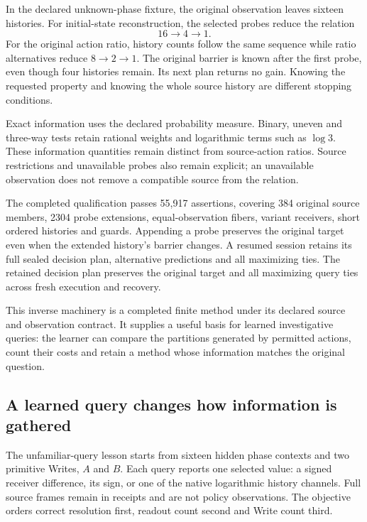 In the declared unknown-phase fixture, the original observation leaves sixteen histories. For initial-state reconstruction, the selected probes reduce the relation
\[
 16\longrightarrow4\longrightarrow1.
\]
For the original action ratio, history counts follow the same sequence while ratio alternatives reduce $8\to2\to1$. The original barrier is known after the first probe, even though four histories remain. Its next plan returns no gain. Knowing the requested property and knowing the whole source history are different stopping conditions.

Exact information uses the declared probability measure. Binary, uneven and three-way tests retain rational weights and logarithmic terms such as $\log3$. These information quantities remain distinct from source-action ratios. Source restrictions and unavailable probes also remain explicit; an unavailable observation does not remove a compatible source from the relation.

The completed qualification passes 55,917 assertions, covering 384 original source members, 2304 probe extensions, equal-observation fibers, variant receivers, short ordered histories and guards. Appending a probe preserves the original target even when the extended history's barrier changes. A resumed session retains its full sealed decision plan, alternative predictions and all maximizing ties. The retained decision plan preserves the original target and all maximizing query ties across fresh execution and recovery.

This inverse machinery is a completed finite method under its declared source and observation contract. It supplies a useful basis for learned investigative queries: the learner can compare the partitions generated by permitted actions, count their costs and retain a method whose information matches the original question.

\subsection{A learned query changes how information is gathered}
\label{v3-runtime-queries}

The unfamiliar-query lesson starts from sixteen hidden phase contexts and two primitive Writes, $A$ and $B$. Each query reports one selected value: a signed receiver difference, its sign, or one of the native logarithmic history channels. Full source frames remain in receipts and are not policy observations. The objective orders correct resolution first, readout count second and Write count third.

